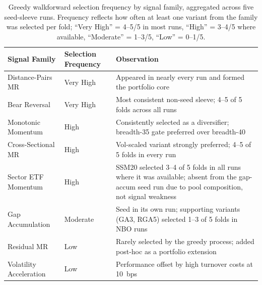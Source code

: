 \begin{table}[H]
    \centering
    \footnotesize
    \setlength{\tabcolsep}{5pt}
    \begin{tabularx}{\textwidth}{p{} p{} >{\raggedright\arraybackslash}X}
        \toprule
        Signal Family & Selection Frequency & Observation \\
        \midrule
        Distance-Pairs MR  & Very High & Appeared in nearly every run and formed the portfolio core \\
        Bear Reversal       & Very High & Most consistent non-seed sleeve; 4--5 of 5 folds across all runs \\
        Monotonic Momentum  & High      & Consistently selected as a diversifier; breadth-35 gate preferred over breadth-40 \\
        Cross-Sectional MR  & High      & Vol-scaled variant strongly preferred; 4--5 of 5 folds in every run \\
        Sector ETF Momentum & High      & SSM20 selected 3--4 of 5 folds in all runs where it was available; absent from the gap-accum seed run due to pool composition, not signal weakness \\
        Gap Accumulation    & Moderate  & Seed in its own run; supporting variants (GA3, RGA5) selected 1--3 of 5 folds in NBO runs \\
        Residual MR         & Low       & Rarely selected by the greedy process; added post-hoc as a portfolio extension \\
        Volatility Acceleration & Low   & Performance offset by high turnover costs at 10~bps \\
        \bottomrule
    \end{tabularx}
    \caption{Greedy walkforward selection frequency by signal family, aggregated across five seed-sleeve runs. Frequency reflects how often at least one variant from the family was selected per fold; ``Very High'' = 4--5/5 in most runs, ``High'' = 3--4/5 where available, ``Moderate'' = 1--3/5, ``Low'' = 0--1/5.}
    \label{tab:selection_frequency}
\end{table}
